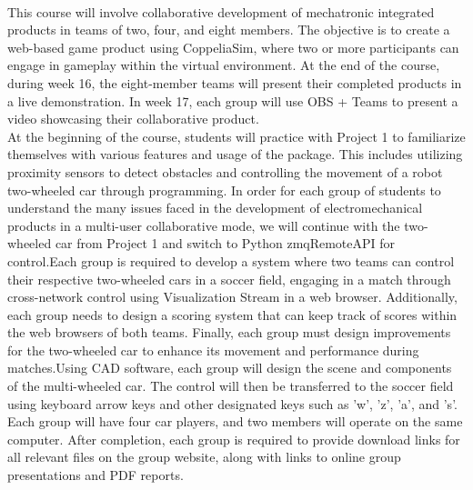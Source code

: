 \begin{center}
\LARGE\textbf{}\\
\begin{flushleft}
\fontsize{14pt}{16pt}\sectionef\hspace{12pt}\quad This course will involve collaborative development of mechatronic integrated products in teams of two, four, and eight members. The objective is to create a web-based game product using CoppeliaSim, where two or more participants can engage in gameplay within the virtual environment. At the end of the course, during week 16, the eight-member teams will present their completed products in a live demonstration. In week 17, each group will use OBS + Teams to present a video showcasing their collaborative product.\\[12pt]

\fontsize{14pt}{16pt}\sectionef\hspace{12pt}\quad At the beginning of the course, students will practice with Project 1 to familiarize themselves with various features and usage of the package. This includes utilizing proximity sensors to detect obstacles and controlling the movement of a robot two-wheeled car through programming. In order for each group of students to understand the many issues faced in the development of electromechanical products in a multi-user collaborative mode, we will continue with the two-wheeled car from Project 1 and switch to Python zmqRemoteAPI for control.Each group is required to develop a system where two teams can control their respective two-wheeled cars in a soccer field, engaging in a match through cross-network control using Visualization Stream in a web browser. Additionally, each group needs to design a scoring system that can keep track of scores within the web browsers of both teams. Finally, each group must design improvements for the two-wheeled car to enhance its movement and performance during matches.Using CAD software, each group will design the scene and components of the multi-wheeled car. The control will then be transferred to the soccer field using keyboard arrow keys and other designated keys such as 'w', 'z', 'a', and 's'. Each group will have four car players, and two members will operate on the same computer. After completion, each group is required to provide download links for all relevant files on the group website, along with links to online group presentations and PDF reports.\\[12pt]


\end{flushleft}
\end{center}
